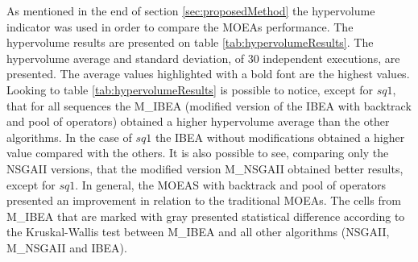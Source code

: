 As mentioned in the end of section \ref{sec:proposedMethod} the hypervolume indicator was used in order to compare the MOEAs performance. The hypervolume results are presented on table \ref{tab:hypervolumeResults}. The hypervolume average and standard deviation, of 30 independent executions, are presented. The average values highlighted with a bold font are the highest values. 
Looking to table \ref{tab:hypervolumeResults} is possible to notice, except for $sq1$, that for all sequences the M\_IBEA (modified version of the IBEA with backtrack and pool of operators) obtained a higher hypervolume average than the other algorithms. In the case of $sq1$ the IBEA without modifications obtained a higher value compared with the others. It is also possible to see, comparing only the NSGAII versions, that the modified version M\_NSGAII obtained better results, except for $sq1$. In general, the MOEAS with backtrack and pool of operators presented an improvement in relation to the traditional MOEAs. The cells from M\_IBEA that are marked with gray presented statistical difference according to the Kruskal-Wallis test \cite{mckight2010kruskal} between M\_IBEA and all other algorithms (NSGAII, M\_NSGAII and IBEA). 

   

